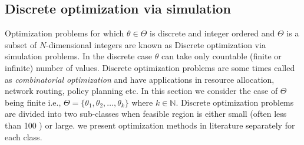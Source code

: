 \subsection{Discrete optimization via simulation}
Optimization problems for which $\theta \in \Theta$ is discrete and integer ordered and $\Theta$ is a subset of $N$-dimensional integers are known as Discrete optimization via simulation problems. In the discrete case $\theta$ can take only countable (finite or infinite) number of values. Discrete optimization problems are some times called as \emph{combinatorial optimization} and have applications in resource allocation, network routing, policy planning etc.
In this section we consider the case of $\Theta$ being finite i.e., $\Theta = \{\theta_{1},\theta_{2},\ldots,\theta_{k}\}$ where $k \in \mathbb{N}$. Discrete optimization problems are divided into two sub-classes when feasible region is  either small (often less than 100 ) or large. we present optimization methods in literature separately for each class.\\
